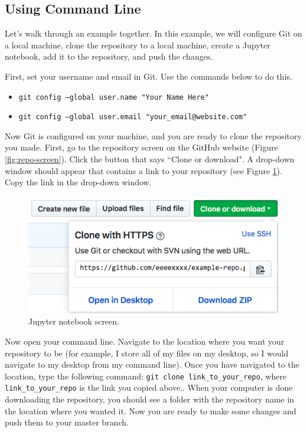 \documentclass[11pt,a4paper]{article}
\begin{document}
\subsection{Using Command Line} \label{command-line}
Let's walk through an example together.
In this example, we will configure Git on a local machine, clone the repository to a local machine, create a Jupyter notebook, add it to the repository, and push the changes.

First, set your username and email in Git.
Use the commands below to do this.

\begin{itemize}
\item[] \texttt{git config --global user.name "Your Name Here"}
\item[] \texttt{git config --global user.email "your\_email@website.com"}
\end{itemize}

Now Git is configured on your machine, and you are ready to clone the repository you made.
First, go to the repository screen on the GitHub website (Figure \ref{fig:repo-screen}).
Click the button that says ``Clone or download".
A drop-down window should appear that contains a link to your repository (see Figure \ref{fig:clone-screen}).
Copy the link in the drop-down window.

\begin{figure}[h]
\centering
\includegraphics[width=.7\textwidth]{figures/clone_screen.png}
\caption{Jupyter notebook screen.}
\label{fig:clone-screen}
\end{figure}

Now open your command line.
Navigate to the location where you want your repository to be (for example, I store all of my files on my desktop, so I would navigate to my desktop from my command line).
Once you have navigated to the location, type the following command: \texttt{git clone link\_to\_your\_repo}, where \texttt{link\_to\_your\_repo} is the link you copied above..
When your computer is done downloading the repository, you should see a folder with the repository name in the location where you wanted it.
Now you are ready to make some changes and push them to your master branch.
\end{document}
